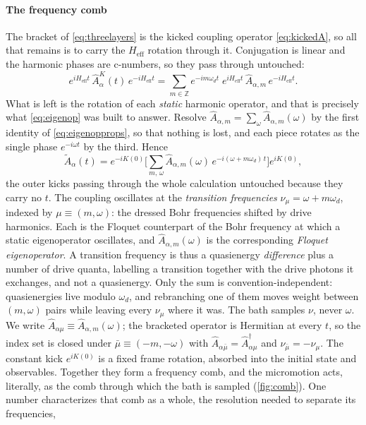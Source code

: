 \documentclass[a4paper,11pt]{article}
\newcommand{\eff}{\mathrm{eff}}
\begin{document}
\paragraph{The frequency comb}
The bracket of \cref{eq:threelayers} is the kicked coupling operator \eqref{eq:kickedA}, so all that remains is to carry the $H_\eff$ rotation through it. Conjugation is linear and the harmonic phases are c-numbers, so they pass through untouched:
\begin{equation}
  e^{iH_\eff t}\,\hat A^K_\alpha(t)\,e^{-iH_\eff t}
  = \sum_{m\in\mathbb Z} e^{-im\omega_d t}\;
  e^{iH_\eff t}\,\hat A_{\alpha,m}\,e^{-iH_\eff t}.
\end{equation}
What is left is the rotation of each \emph{static} harmonic operator, and that is precisely what \cref{eq:eigenop} was built to answer. Resolve $\hat A_{\alpha,m} = \sum_\omega \hat A_{\alpha,m}(\omega)$ by the first identity of \cref{eq:eigenopprops}, so that nothing is lost, and each piece rotates as the single phase $e^{-i\omega t}$ by the third. Hence
\begin{equation}\label{eq:comb}
  \tilde A_\alpha(t) = e^{-iK(0)}\Big[\sum_{m,\,\omega} \hat A_{\alpha,m}(\omega)\,e^{-i(\omega + m\omega_d)\,t}\Big]e^{iK(0)} ,
\end{equation}
the outer kicks passing through the whole calculation untouched because they carry no $t$.
The coupling oscillates at the \emph{transition frequencies} $\nu_\mu = \omega + m\omega_d$, indexed by $\mu \equiv (m,\omega)$: the dressed Bohr frequencies shifted by drive harmonics. Each is the Floquet counterpart of the Bohr frequency at which a static eigenoperator oscillates, and $\hat A_{\alpha,m}(\omega)$ is the corresponding \emph{Floquet eigenoperator}. A transition frequency is thus a quasienergy \emph{difference} plus a number of drive quanta, labelling a transition together with the drive photons it exchanges, and not a quasienergy. Only the sum is convention-independent: quasienergies live modulo $\omega_d$, and rebranching one of them moves weight between $(m,\omega)$ pairs while leaving every $\nu_\mu$ where it was. The bath samples $\nu$, never $\omega$. We write $\hat A_{\alpha\mu} \equiv \hat A_{\alpha,m}(\omega)$; the bracketed operator is Hermitian at every $t$, so the index set is closed under $\bar\mu \equiv (-m,-\omega)$ with $\hat A_{\alpha\bar\mu} = \hat A_{\alpha\mu}^\dagger$ and $\nu_{\bar\mu} = -\nu_\mu$. The constant kick $e^{iK(0)}$ is a fixed frame rotation, absorbed into the initial state and observables. Together they form a frequency comb, and the micromotion acts, literally, as the comb through which the bath is sampled (\cref{fig:comb}). One number characterizes that comb as a whole, the resolution needed to separate its frequencies,
\end{document}
